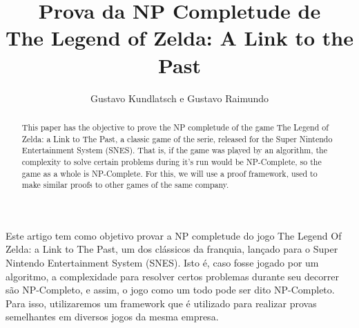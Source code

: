 \documentclass[12pt]{article}
\title{Prova da NP Completude de
\\The Legend of Zelda: A Link to the Past}
\author{Gustavo Kundlatsch e Gustavo Raimundo}
\begin{document}
 

\maketitle

\begin{abstract}
  This paper has the objective to prove the NP completude of the game The Legend of Zelda: a Link to The Past,
  a classic game of the serie, released for the Super Nintendo Entertainment System (SNES).
  That is, if the game was played by an algorithm, the complexity to solve certain problems
  during it's run would be NP-Complete, so the game as a whole is NP-Complete. For this, we 
  will use a proof framework, used to make similar proofs to other games of the same company.
\end{abstract}
     
\begin{resumo} 
  Este artigo tem como objetivo provar a NP completude do jogo The Legend Of Zelda: a Link to The Past,
  um dos clássicos da franquia, lançado para o Super Nintendo Entertainment System (SNES). 
  Isto é, caso fosse jogado por um algoritmo, a complexidade
  para resolver certos problemas durante seu decorrer são NP-Completo, e assim,
  o jogo como um todo pode ser dito NP-Completo. Para isso, utilizaremos um framework
  que é utilizado para realizar provas semelhantes em diversos jogos da mesma empresa.
\end{resumo}














\end{document}
